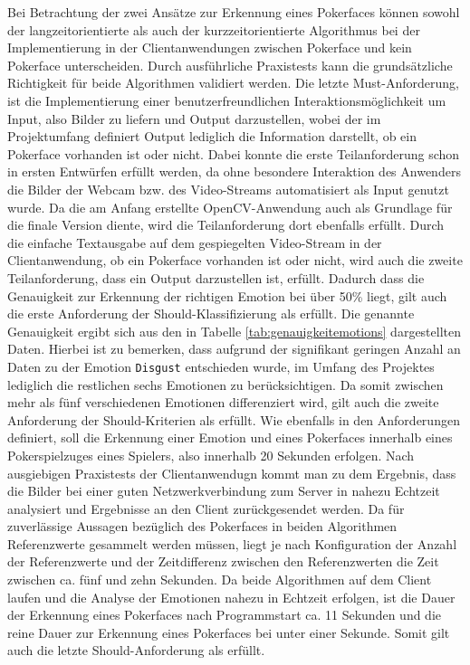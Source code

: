 \documentclass[12pt, a4paper]{report}
\begin{document}
Bei Betrachtung der zwei Ansätze zur Erkennung eines Pokerfaces können sowohl der langzeitorientierte als auch der kurzzeitorientierte Algorithmus bei der Implementierung in der Clientanwendungen zwischen Pokerface und kein Pokerface unterscheiden. Durch ausführliche Praxistests kann die grundsätzliche Richtigkeit für beide Algorithmen validiert werden. Die letzte Must-Anforderung, ist die Implementierung einer benutzerfreundlichen Interaktionsmöglichkeit um Input, also Bilder zu liefern und Output darzustellen, wobei der im Projektumfang definiert Output lediglich die Information darstellt, ob ein Pokerface vorhanden ist oder nicht. Dabei konnte die erste Teilanforderung schon in ersten Entwürfen erfüllt werden, da ohne besondere Interaktion des Anwenders die Bilder der Webcam bzw. des Video-Streams automatisiert als Input genutzt wurde. Da die am Anfang erstellte OpenCV-Anwendung auch als Grundlage für die finale Version diente, wird die Teilanforderung dort ebenfalls erfüllt. Durch die einfache Textausgabe auf dem gespiegelten Video-Stream in der Clientanwendung, ob ein Pokerface vorhanden ist oder nicht, wird auch die zweite Teilanforderung, dass ein Output darzustellen ist, erfüllt.\newline
Dadurch dass die Genauigkeit zur Erkennung der richtigen Emotion bei über 50\% liegt, gilt auch die erste Anforderung der Should-Klassifizierung als erfüllt. Die genannte Genauigkeit ergibt sich aus den in Tabelle \ref{tab:genauigkeitemotions} dargestellten Daten. Hierbei ist zu bemerken, dass aufgrund der signifikant geringen Anzahl an Daten zu der Emotion \texttt{Disgust} entschieden wurde, im Umfang des Projektes lediglich die restlichen sechs Emotionen zu berücksichtigen. Da somit zwischen mehr als fünf verschiedenen Emotionen differenziert wird, gilt auch die zweite Anforderung der Should-Kriterien als erfüllt. Wie ebenfalls in den Anforderungen definiert, soll die Erkennung einer Emotion und eines Pokerfaces innerhalb eines Pokerspielzuges eines Spielers, also innerhalb 20 Sekunden erfolgen. Nach ausgiebigen Praxistests der Clientanwendugn kommt man zu dem Ergebnis, dass die Bilder bei einer guten Netzwerkverbindung zum Server in nahezu Echtzeit analysiert und Ergebnisse an den Client zurückgesendet werden. Da für zuverlässige Aussagen bezüglich des Pokerfaces in beiden Algorithmen Referenzwerte gesammelt werden müssen, liegt je nach Konfiguration der Anzahl der Referenzwerte und der Zeitdifferenz zwischen den Referenzwerten die Zeit zwischen ca. fünf und zehn Sekunden. Da beide Algorithmen auf dem Client laufen und die Analyse der Emotionen nahezu in Echtzeit erfolgen, ist die Dauer der Erkennung eines Pokerfaces nach Programmstart ca. 11 Sekunden und die reine Dauer zur Erkennung eines Pokerfaces bei unter einer Sekunde. Somit gilt auch die letzte Should-Anforderung als erfüllt.\newline
\end{document}
